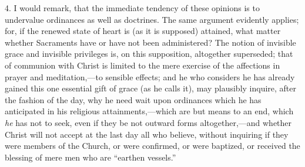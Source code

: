 4. I would remark, that the immediate tendency of these opinions is
to undervalue ordinances as well as doctrines. The same argument
evidently applies; for, if the renewed state of heart is (as it is
supposed) attained, what matter whether Sacraments have or have not been
administered? The notion of invisible grace and invisible privileges is,
on this supposition, altogether superseded; that of communion with
Christ is limited to the mere exercise of the affections in prayer and
meditation,—to sensible effects; and he who considers he has already
gained this one essential gift of grace (as he calls it), may plausibly
inquire, after the fashion of the day, why he need wait upon ordinances
which he has anticipated in his religious attainments,—which are but
means to an end, which \emph{he} has not to seek, even if they be not
outward forms altogether,—and whether Christ will not accept at the
last day all who believe, without inquiring if they were members of the
Church, or were confirmed, or were baptized, or received the blessing of
mere men who are ``earthen vessels.''

